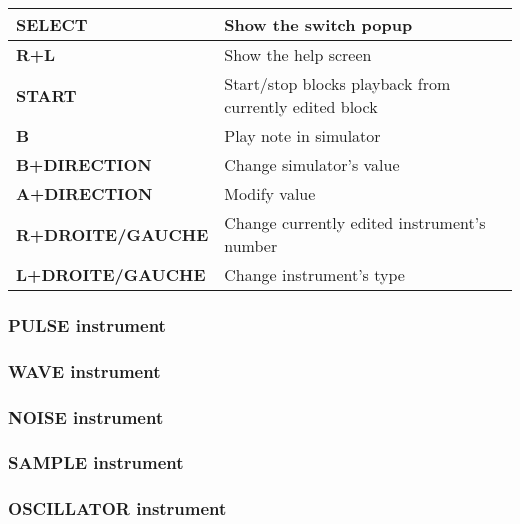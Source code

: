 \tablelasttail{\hline}
\begin{supertabular}{|l|p{11cm}|}
\hline
    {\bf SELECT} & Show the switch popup \\
    \hline
    {\bf R+L} & Show the help screen \\
    \hline
    {\bf START} & Start/stop blocks playback from currently edited block \\
    \hline
    {\bf B} & Play note in simulator \\
    \hline
    {\bf B+DIRECTION} & Change simulator's value \\
    \hline
    {\bf A+DIRECTION} & Modify value \\
    \hline
    {\bf R+DROITE/GAUCHE} & Change currently edited instrument's number \\
    \hline
    {\bf L+DROITE/GAUCHE} & Change instrument's type \\
\hline
\end{supertabular}

\subsubsection{PULSE instrument}


\subsubsection{WAVE instrument}


\subsubsection{NOISE instrument}


\subsubsection{SAMPLE instrument}


\subsubsection{OSCILLATOR instrument}

